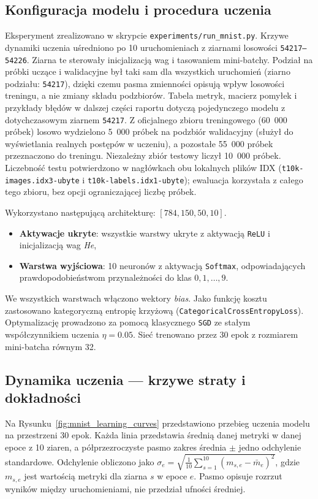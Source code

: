 \documentclass[11pt,a4paper]{article}
\begin{document}
\subsection{Konfiguracja modelu i procedura uczenia}

Eksperyment zrealizowano w skrypcie \texttt{experiments/run\_mnist.py}.
Krzywe dynamiki uczenia uśredniono po 10 uruchomieniach z ziarnami losowości
\texttt{54217--54226}. Ziarna te sterowały inicjalizacją wag i tasowaniem mini-batchy.
Podział na próbki uczące i walidacyjne był taki sam dla wszystkich uruchomień
(ziarno podziału: \texttt{54217}), dzięki czemu pasma zmienności opisują wpływ losowości treningu,
a nie zmiany składu podzbiorów. Tabela metryk, macierz pomyłek i przykłady błędów
w dalszej części raportu dotyczą pojedynczego modelu z dotychczasowym ziarnem \texttt{54217}.
Z oficjalnego zbioru treningowego (60~000 próbek) losowo wydzielono 5~000 próbek na podzbiór walidacyjny (służył do wyświetlania
realnych postępów w uczeniu), a pozostałe 55~000 próbek przeznaczono do treningu. Niezależny zbiór testowy liczył 10~000 próbek.
Liczebność testu potwierdzono w nagłówkach obu lokalnych plików IDX
(\texttt{t10k-images.idx3-ubyte} i \texttt{t10k-labels.idx1-ubyte});
ewaluacja korzystała z całego tego zbioru, bez opcji ograniczającej liczbę próbek.

Wykorzystano następującą architekturę: $[784, 150, 50, 10]$.
\begin{itemize}
    \item \textbf{Aktywacje ukryte}: wszystkie warstwy ukryte z aktywacją \texttt{ReLU} i inicjalizacją wag \textit{He},
    \item \textbf{Warstwa wyjściowa}: 10 neuronów z aktywacją \texttt{Softmax}, odpowiadających prawdopodobieństwom przynależności do klas $0, 1, \dots, 9$.
\end{itemize}
We wszystkich warstwach włączono wektory \textit{bias}.
Jako funkcję kosztu zastosowano kategoryczną entropię krzyżową (\texttt{CategoricalCrossEntropyLoss}).
Optymalizację prowadzono za pomocą klasycznego \texttt{SGD} ze stałym współczynnikiem uczenia $\eta = 0.05$.
Sieć trenowano przez 30 epok z rozmiarem mini-batcha równym 32.

\subsection{Dynamika uczenia — krzywe straty i dokładności}

Na Rysunku~\ref{fig:mnist_learning_curves} przedstawiono przebieg uczenia modelu na przestrzeni 30 epok.
Każda linia przedstawia średnią danej metryki w danej epoce z 10 ziaren,
a półprzezroczyste pasmo zakres średnia $\pm$ jedno odchylenie standardowe.
Odchylenie obliczono jako $\sigma_e = \sqrt{\frac{1}{10}\sum_{s=1}^{10}(m_{s,e}-\bar{m}_e)^2}$,
gdzie $m_{s,e}$ jest wartością metryki dla ziarna $s$ w epoce $e$.
Pasmo opisuje rozrzut wyników między uruchomieniami, nie przedział ufności średniej.
\end{document}
